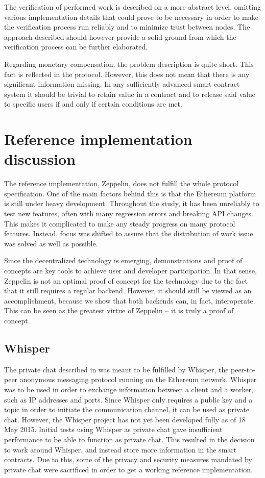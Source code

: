 The verification of performed work is described on a more abstract level, omitting various implementation details that could prove to be necessary in order to make the verification process run reliably and to minimize trust between nodes. The approach described should however provide a solid ground from which the verification process can be further elaborated.

Regarding monetary compensation, the problem description is quite short. This fact is reflected in the protocol. However, this does not mean that there is any significant information missing. In any sufficiently advanced smart contract system it should be trivial to retain value in a contract and to release said value to specific users if and only if certain conditions are met.

\section{Reference implementation discussion}
The reference implementation, Zeppelin, does not fulfill the whole protocol specification. One of the main factors behind this is that the Ethereum platform is still under heavy development. Throughout the study, it has been unreliably to test new features, often with many regression errors and breaking API changes. This makes it complicated to make any steady progress on many protocol features. Instead, focus was shifted to assure that the distribution of work issue was solved as well as possible.

Since the decentralized technology is emerging, demonstrations and proof of concepts are key tools to achieve user and developer participation. In that sense, Zeppelin is not an optimal proof of concept for the technology due to the fact that it still requires a regular backend. However, it should still be viewed as an accomplishment, because we show that both backends can, in fact, interoperate. This can be seen as the greatest virtue of Zeppelin -- it is truly a proof of concept.

\subsection{Whisper}
The private chat described in  was meant to be fulfilled by Whisper, the peer-to-peer anonymous messaging protocol running on the Ethereum network. Whisper was to be used in order to exchange information between a client and a worker, such as IP addresses and ports. Since Whisper only requires a public key and a topic in order to initiate the communication channel, it can be used as private chat. However, the Whisper project has not yet been developed fully as of 18 May 2015. Initial tests using Whisper as private chat gave insufficient performance to be able to function as private chat. This resulted in the decision to work around Whisper, and instead store more information in the smart contracts. Due to this, some of the privacy and security measures mandated by private chat were sacrificed in order to get a working reference implementation.

